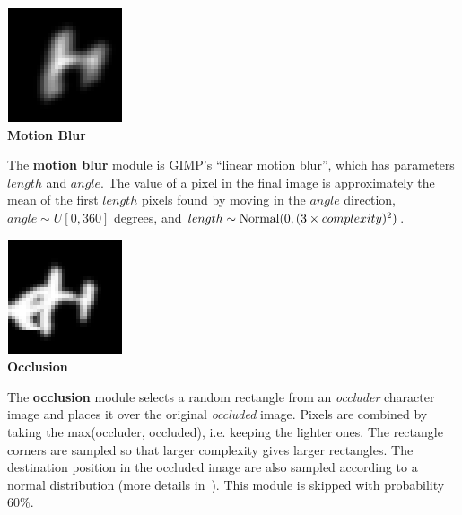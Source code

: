 \documentclass{article} %
\begin{document}
\begin{minipage}[t]{0.14\linewidth}
\centering
\vspace*{-2mm}
\includegraphics[scale=.4]{images/Motionblur_only.png}\\
{\bf Motion Blur}
\end{minipage}%
\hspace{0.3cm}\begin{minipage}[t]{0.83\linewidth}
The {\bf motion blur} module is GIMP's ``linear motion blur'', which
has parameters $length$ and $angle$. The value of
a pixel in the final image is approximately the  mean of the first $length$ pixels
found by moving in the $angle$ direction,
$angle \sim U[0,360]$ degrees, and $length \sim {\rm Normal}(0,(3 \times complexity)^2)$.
\vspace{5mm}
\end{minipage}

\vspace*{1mm}

\begin{minipage}[t]{0.14\linewidth}
\centering
\includegraphics[scale=.4]{images/occlusion_only.png}\\
{\bf Occlusion}
\end{minipage}%
\hspace{0.3cm}\begin{minipage}[t]{0.83\linewidth}
\vspace*{-18mm}
The {\bf occlusion} module selects a random rectangle from an {\em occluder} character
image and places it over the original {\em occluded}
image. Pixels are combined by taking the max(occluder, occluded),
i.e. keeping the lighter ones.
The rectangle corners
are sampled so that larger complexity gives larger rectangles.
The destination position in the occluded image are also sampled
according to a normal distribution (more details in~\citet{ift6266-tr-anonymous}).
This module is skipped with probability 60\%.
\end{minipage}
\end{document}
